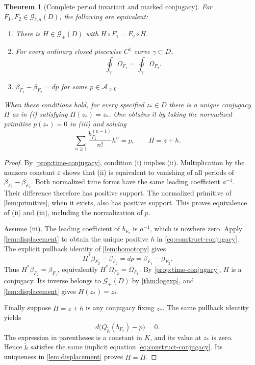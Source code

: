 \documentclass[11pt,a4paper]{article}
\numberwithin{equation}{section}
\newtheorem{theorem}{Theorem}[section]
\theoremstyle{definition}
\theoremstyle{remark}
\newcommand{\A}{\mathcal A}
\newcommand{\G}{\mathcal G}
\newcommand{\eps}{\varepsilon}
\begin{document}
\begin{theorem}[Complete period invariant and marked conjugacy]
\label{thm:classification}
For $F_1,F_2\in\G_{\delta,a}(D)$, the following are equivalent:
\begin{enumerate}[label=(\roman*)]
\item There is $H\in\G_+(D)$ with $H\circ F_1=F_2\circ H$.
\item For every ordinary closed piecewise $C^1$ curve $\gamma\subset D$,
\[
 \oint_\gamma\Omega_{F_1}=\oint_\gamma\Omega_{F_2}.
\]
\item $\beta_{F_1}-\beta_{F_2}=dp$ for some $p\in\A_{>0}$.
\end{enumerate}
When these conditions hold, for every specified $z_*\in D$ there is a
unique conjugacy $H$ as in \textup{(i)} satisfying $H(z_*)=z_*$.
One obtains it by taking the normalized primitive $p(z_*)=0$ in
\textup{(iii)} and solving
\begin{equation}\label{eq:construct-conjugacy}
 \sum_{n\geq1}\frac{b_{F_2}^{(n-1)}}{n!}h^n=p,
 \qquad H=z+h.
\end{equation}
\end{theorem}

\begin{proof}
By \cref{prop:time-conjugacy}, condition (i) implies (ii).
Multiplication by the nonzero constant $\eps$ shows that (ii) is equivalent
to vanishing of all periods of $\beta_{F_1}-\beta_{F_2}$.
Both normalized time forms have the same leading coefficient $a^{-1}$.
Their difference therefore has positive support.  The normalized primitive
of \cref{lem:primitive}, when it exists, also has positive support.  This
proves equivalence of (ii) and (iii), including the normalization of $p$.

Assume (iii).  The leading coefficient of $b_{F_2}$ is $a^{-1}$, which
is nowhere zero.  Apply \cref{lem:displacement} to obtain the unique
positive $h$ in \eqref{eq:construct-conjugacy}.  The explicit pullback
identity of \cref{lem:homotopy} gives
\[
 H^*\beta_{F_2}-\beta_{F_2}=dp
             =\beta_{F_1}-\beta_{F_2}.
\]
Thus $H^*\beta_{F_2}=\beta_{F_1}$, equivalently
$H^*\Omega_{F_2}=\Omega_{F_1}$.  By
\cref{prop:time-conjugacy}, $H$ is a conjugacy.  Its inverse belongs to
$\G_+(D)$ by \cref{thm:logexp}, and
\cref{lem:displacement} gives $H(z_*)=z_*$.

Finally suppose $\widetilde H=z+\widetilde h$ is any conjugacy fixing
$z_*$.  The same pullback identity yields
\[
 d\bigl(Q_{\widetilde h}(b_{F_2})-p\bigr)=0.
\]
The expression in parentheses is a constant in $K$, and its value at
$z_*$ is zero.  Hence $\widetilde h$ satisfies the same implicit equation
\eqref{eq:construct-conjugacy}.  Its uniqueness in
\cref{lem:displacement} proves $\widetilde H=H$.
\end{proof}
\end{document}
